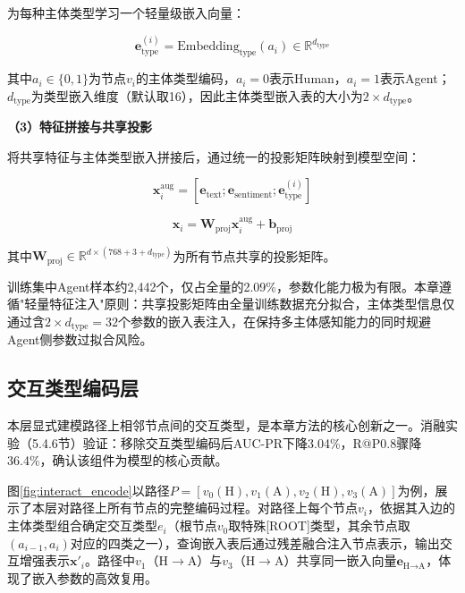 为每种主体类型学习一个轻量级嵌入向量：

\begin{equation}
\mathbf{e}_{\text{type}}^{(i)} = \text{Embedding}_{\text{type}}(a_i) \in \mathbb{R}^{d_{\text{type}}}
\end{equation}

其中$a_i \in \{0, 1\}$为节点$v_i$的主体类型编码，$a_i=0$表示Human，$a_i=1$表示Agent；$d_{\text{type}}$为类型嵌入维度（默认取16），因此主体类型嵌入表的大小为$2 \times d_{\text{type}}$。

\textbf{（3）特征拼接与共享投影}

将共享特征与主体类型嵌入拼接后，通过统一的投影矩阵映射到模型空间：

\begin{equation}
\mathbf{x}_i^{\text{aug}} = [\mathbf{e}_{\text{text}}; \mathbf{e}_{\text{sentiment}}; \mathbf{e}_{\text{type}}^{(i)}]
\end{equation}

\begin{equation}
\mathbf{x}_i = \mathbf{W}_{\text{proj}} \mathbf{x}_i^{\text{aug}} + \mathbf{b}_{\text{proj}}
\end{equation}

其中$\mathbf{W}_{\text{proj}} \in \mathbb{R}^{d \times (768 + 3 + d_{\text{type}})}$为所有节点共享的投影矩阵。

训练集中Agent样本约2,442个，仅占全量的2.09\%，参数化能力极为有限。本章遵循"轻量特征注入"原则：共享投影矩阵由全量训练数据充分拟合，主体类型信息仅通过含$2 \times d_{\text{type}} = 32$个参数的嵌入表注入，在保持多主体感知能力的同时规避Agent侧参数过拟合风险。

\subsection{交互类型编码层}

本层显式建模路径上相邻节点间的交互类型，是本章方法的核心创新之一。消融实验（5.4.6节）验证：移除交互类型编码后AUC-PR下降3.04\%，R@P0.8骤降36.4\%，确认该组件为模型的核心贡献。

图\ref{fig:interact_encode}以路径$P=[v_0(\text{H}), v_1(\text{A}), v_2(\text{H}), v_3(\text{A})]$为例，展示了本层对路径上所有节点的完整编码过程。对路径上每个节点$v_i$，依据其入边的主体类型组合确定交互类型$e_i$（根节点$v_0$取特殊[ROOT]类型，其余节点取$(a_{i-1}, a_i)$对应的四类之一），查询嵌入表后通过残差融合注入节点表示，输出交互增强表示$\mathbf{x}'_i$。路径中$v_1$（H$\to$A）与$v_3$（H$\to$A）共享同一嵌入向量$\mathbf{e}_{\text{H} \to \text{A}}$，体现了嵌入参数的高效复用。

